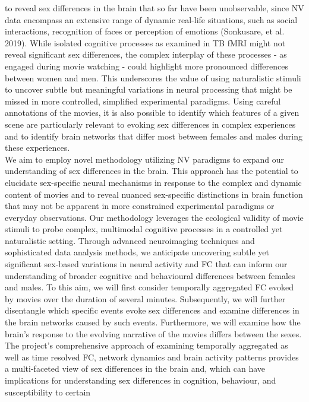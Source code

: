 \documentclass[11pt,a4paper]{article}
\begin{document}
to reveal sex differences in the brain that so far have been unobservable, since NV data encompass an extensive 
range of dynamic real-life situations, such as social interactions, recognition of faces or perception of 
emotions (Sonkusare, et al. 2019). While isolated cognitive processes as examined in TB fMRI might not reveal 
significant sex differences, the complex interplay of these processes - as engaged during movie watching - could 
highlight more pronounced differences between women and men. This underscores the value of using naturalistic stimuli 
to uncover subtle but meaningful variations in neural processing that might be missed in more controlled, simplified 
experimental paradigms. Using careful annotations of the movies, it is also possible to identify which features 
of a given scene are particularly relevant to evoking sex differences in complex experiences and to identify 
brain networks that differ most between females and males during these experiences.\\
We aim to employ novel methodology utilizing NV paradigms to expand our understanding of sex differences in the 
brain. This approach has the potential to elucidate sex-specific neural mechanisms in response to the complex and 
dynamic content of movies and to reveal nuanced sex-specific distinctions in brain function that may not be apparent 
in more constrained experimental paradigms or everyday observations. Our methodology leverages the ecological 
validity of movie stimuli to probe complex, multimodal cognitive processes in a controlled yet naturalistic setting. 
Through advanced neuroimaging techniques and sophisticated data analysis methods, we anticipate uncovering 
subtle yet significant sex-based variations in neural activity and FC that can inform our understanding of 
broader cognitive and behavioural differences between females and males. To this aim, we will first consider 
temporally aggregated FC evoked by movies over the duration of several minutes. Subsequently, we will further 
disentangle which specific events evoke sex differences and examine differences in the brain networks caused by 
such events. Furthermore, we will examine how the brain’s response to the evolving narrative of the movies differs 
between the sexes. The project's comprehensive approach of examining temporally aggregated as well as time resolved FC, 
network dynamics and brain activity patterns provides a multi-faceted view of sex differences in the brain and, 
which can have implications for understanding sex differences in cognition, behaviour, and susceptibility to certain 
\end{document}
